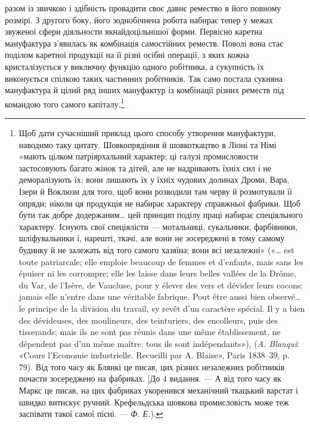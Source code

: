 \parcont{}  %
разом із звичкою і здібність провадити своє давнє ремество в
його повному розмірі. З другого боку, його зоднобічнена робота
набирає тепер у межах звуженої сфери діяльности якнайдоцільнішої
форми. Первісно каретна мануфактура з’явилась як комбінація
самостійних реместв. Поволі вона стає поділом каретної
продукції на її різні осібні операції, з яких кожна кристалізується
у виключну функцію одного робітника, а сукупність їх
виконується спілкою таких частинних робітників. Так само
постала сукняна мануфактура й цілий ряд інших мануфактур
із комбінації різних реместв під командою того самого капіталу.\footnote{
Щоб дати сучасніший приклад цього способу утворення мануфактури,
наводимо таку цитату. Шовкопрядіння й шовкоткацтво в
Ліоні та Німі «мають цілком патріярхальний характер; ці галузі промисловости
застосовують багато жінок та дітей, але не надривають їхніх
сил і не деморалізують їх; вони лишають їх у їхніх чудових долинах Дроми,
Вара, Ізери й Воклюзи для того, щоб вони розводили там черву й розмотували
її опряди; ніколи ця продукція не набирає характеру справжньої
фабрики. Щоб бути так добре додержаним\dots{} цей принцип поділу праці
набирає спеціяльного характеру. Існують свої спеціялісти — мотальниці,
сукальники, фарбівники, шліфувальники і, нарешті, ткачі, але вони не
зосереджені в тому самому будинку й не залежать від того самого хазяїна;
вони всі незалежні» («\dots{} est toute patriarcale; elle emploie beaucoup de
femmes et d’enfants, mais sans les épuiser ni les corrompre; elle les laisse
dans leurs belles vallées de la Drôme, du Var, de l’Isère, de Vaucluse, pour
y élever des vers et dévider leurs cocons: jamais elle n’entre dans une véritable
fabrique. Pout être aussi bien observé\dots{} le principe de la division
du travail, sy revêt d’un caractère spécial. Il y a bien des dévideuses, des
moulineurs, des teinturiers, des encolleurs, puis des tisserands; mais ils
ne sont pas réunis dans une même établissement, ne dépendent pas d’un
même maître: tous ils sont indépendants»), (\emph{A. Blanqui}: «Cours l'Economie
industrielle. Recueilli par A. Blaise», Paris 1838--39, p. 79).
Від того часу як Блянкі це писав, цих різних незалежних робітників
почасти зосереджено на фабриках. [До 4 видання. — А від того часу
як Маркс це писав, на цих фабриках укоренився механічний ткацький
варстат і швидко витискує ручний. Крефельдська шовкова промисловість
може теж заспівати такої самої пісні. — \emph{Ф. Е.}).
}

